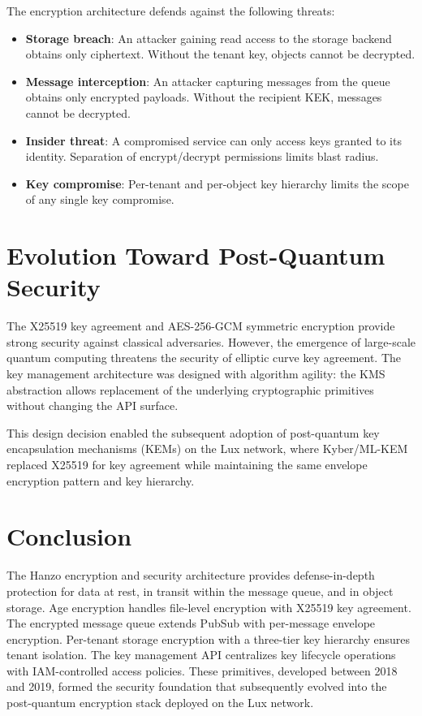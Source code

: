 \documentclass[11pt,a4paper]{article}
\begin{document}
The encryption architecture defends against the following threats:

\begin{itemize}
    \item \textbf{Storage breach}: An attacker gaining read access to the storage backend obtains only ciphertext. Without the tenant key, objects cannot be decrypted.
    \item \textbf{Message interception}: An attacker capturing messages from the queue obtains only encrypted payloads. Without the recipient KEK, messages cannot be decrypted.
    \item \textbf{Insider threat}: A compromised service can only access keys granted to its identity. Separation of encrypt/decrypt permissions limits blast radius.
    \item \textbf{Key compromise}: Per-tenant and per-object key hierarchy limits the scope of any single key compromise.
\end{itemize}

\section{Evolution Toward Post-Quantum Security}

The X25519 key agreement and AES-256-GCM symmetric encryption provide strong security against classical adversaries. However, the emergence of large-scale quantum computing threatens the security of elliptic curve key agreement. The key management architecture was designed with algorithm agility: the KMS abstraction allows replacement of the underlying cryptographic primitives without changing the API surface.

This design decision enabled the subsequent adoption of post-quantum key encapsulation mechanisms (KEMs) on the Lux network, where Kyber/ML-KEM replaced X25519 for key agreement while maintaining the same envelope encryption pattern and key hierarchy.

\section{Conclusion}

The Hanzo encryption and security architecture provides defense-in-depth protection for data at rest, in transit within the message queue, and in object storage. Age encryption handles file-level encryption with X25519 key agreement. The encrypted message queue extends PubSub with per-message envelope encryption. Per-tenant storage encryption with a three-tier key hierarchy ensures tenant isolation. The key management API centralizes key lifecycle operations with IAM-controlled access policies. These primitives, developed between 2018 and 2019, formed the security foundation that subsequently evolved into the post-quantum encryption stack deployed on the Lux network.
\end{document}
